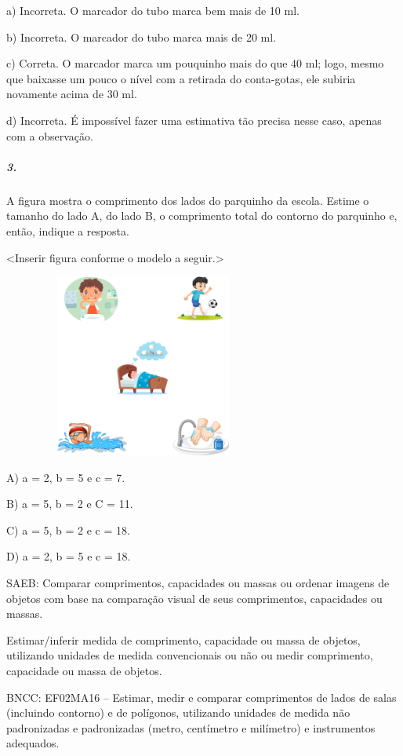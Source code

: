 a) Incorreta. O marcador do tubo marca bem mais de 10 ml.

b) Incorreta. O marcador do tubo marca mais de 20 ml.

c) Correta. O marcador marca um pouquinho mais do que 40 ml; logo, mesmo que baixasse um pouco o nível com a retirada do conta-gotas, ele subiria novamente acima de 30 ml.

d) Incorreta. É impossível fazer uma estimativa tão precisa nesse caso, apenas com a observação.

\subparagraph{3.}\label{section-41}

A figura mostra o comprimento dos lados do parquinho da escola.
Estime o tamanho do lado A, do lado B, o comprimento total do contorno
do parquinho e, então, indique a resposta.

\textless{}Inserir figura conforme o modelo a seguir.\textgreater{}

\includegraphics[width=3.63542in,height=2.37500in]{media/image57.png}

A) a = 2, b = 5 e c = 7.

B) a = 5, b = 2 e C = 11.

C) a = 5, b = 2 e c = 18.

D) a = 2, b = 5 e c = 18.

SAEB: Comparar comprimentos, capacidades ou massas ou ordenar
imagens de objetos com base na comparação visual de seus comprimentos,
capacidades ou massas.

Estimar/inferir medida de comprimento, capacidade ou massa de
objetos, utilizando unidades de medida convencionais ou não ou medir
comprimento, capacidade ou massa de objetos.

BNCC: EF02MA16 -- Estimar, medir e comparar comprimentos de lados de
salas (incluindo contorno) e de polígonos, utilizando unidades de medida não padronizadas e
padronizadas (metro, centímetro e milímetro) e instrumentos adequados.

